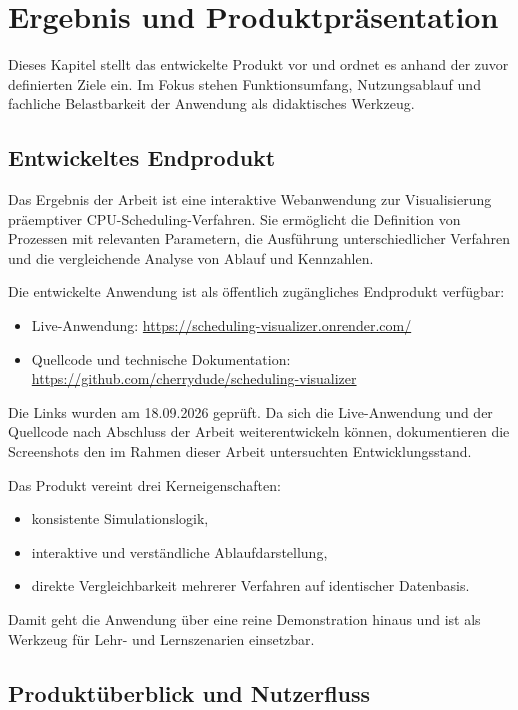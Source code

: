 \chapter{Ergebnis und Produktpräsentation}

Dieses Kapitel stellt das entwickelte Produkt vor und ordnet es anhand der zuvor definierten Ziele ein. Im Fokus stehen Funktionsumfang, Nutzungsablauf und fachliche Belastbarkeit der Anwendung als didaktisches Werkzeug.

\section{Entwickeltes Endprodukt}

Das Ergebnis der Arbeit ist eine interaktive Webanwendung zur Visualisierung präemptiver CPU-Scheduling-Verfahren. Sie ermöglicht die Definition von Prozessen mit relevanten Parametern, die Ausführung unterschiedlicher Verfahren und die vergleichende Analyse von Ablauf und Kennzahlen.

Die entwickelte Anwendung ist als öffentlich zugängliches Endprodukt verfügbar:

\begin{itemize}
    \item Live-Anwendung: \url{https://scheduling-visualizer.onrender.com/}
    \item Quellcode und technische Dokumentation: \url{https://github.com/cherrydude/scheduling-visualizer}
\end{itemize}

Die Links wurden am 18.09.2026 geprüft. Da sich die Live-Anwendung und der Quellcode nach Abschluss der Arbeit weiterentwickeln können, dokumentieren die Screenshots den im Rahmen dieser Arbeit untersuchten Entwicklungsstand.

Das Produkt vereint drei Kerneigenschaften:

\begin{itemize}
    \item konsistente Simulationslogik,
    \item interaktive und verständliche Ablaufdarstellung,
    \item direkte Vergleichbarkeit mehrerer Verfahren auf identischer Datenbasis.
\end{itemize}

Damit geht die Anwendung über eine reine Demonstration hinaus und ist als Werkzeug für Lehr- und Lernszenarien einsetzbar.

\section{Produktüberblick und Nutzerfluss}

